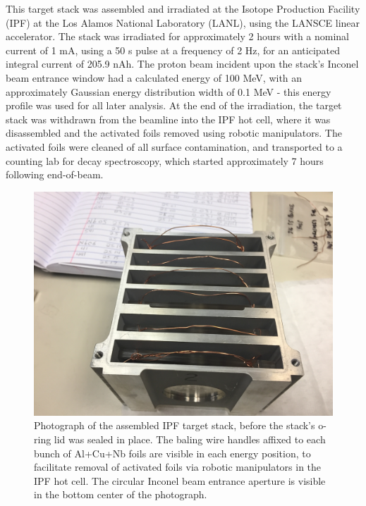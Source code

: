\documentclass[3p]{elsarticle}
\begin{document}
This target stack was assembled and irradiated at the Isotope Production Facility (IPF) at the Los Alamos National Laboratory (LANL), using the LANSCE linear accelerator. 
The stack was irradiated for approximately 2 hours with a nominal current of 1 mA, using a 50 \micro s pulse at a frequency of 2 Hz, for an anticipated integral current of 205.9 nAh.
The proton beam incident upon the stack's Inconel beam entrance window had a calculated energy of 100 MeV, with an approximately Gaussian energy distribution width of 0.1 MeV - this energy profile was used for all later analysis.
At the end of the irradiation, the target stack was withdrawn from the beamline into the IPF hot cell, where it was disassembled and the activated foils removed using robotic manipulators.
The activated foils were cleaned of all surface contamination, and transported to a counting lab for decay spectroscopy, which started approximately 7 hours following end-of-beam.





\begin{figure}
 \centering
 \includegraphics[scale=0.1,clip=true,trim=13cm 0cm 3cm 6cm]{./figures/IMG_1975.JPG}
 \caption{Photograph of the assembled IPF target stack, before the stack's o-ring lid was sealed in place. The baling wire handles affixed to each bunch of Al+Cu+Nb foils are visible in each energy position, to facilitate removal of activated foils via robotic manipulators in the IPF hot cell. The circular Inconel beam entrance aperture is visible in the bottom center of the photograph.  }
 \label{fig:target_stack}
\end{figure}
\end{document}
